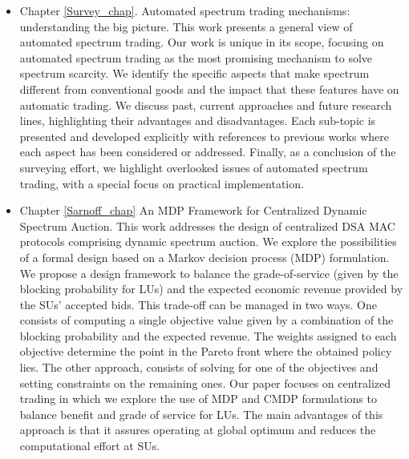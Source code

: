 \begin{itemize}
\item Chapter \ref{Survey_chap}. Automated spectrum trading mechanisms: understanding the big picture.
This work presents a general view of automated spectrum trading.
Our work is unique in its scope, focusing on automated spectrum trading as the most promising mechanism to solve spectrum scarcity.
We identify the specific aspects that make spectrum different from conventional goods and the impact that these features have on automatic trading.
We discuss past, current approaches and future research lines, highlighting their advantages and disadvantages. 
Each sub-topic is presented and developed explicitly with references to previous works where each aspect has been considered or addressed.
Finally, as a conclusion of the surveying effort, we highlight overlooked issues of automated spectrum trading, with a special focus on practical implementation.
\item Chapter \ref{Sarnoff_chap} An MDP Framework for Centralized Dynamic Spectrum Auction.
This work addresses the design of centralized DSA MAC protocols comprising dynamic spectrum auction. We explore the possibilities of a formal design based on a Markov decision process (MDP) formulation. We propose a design framework to balance the grade-of-service (given by the blocking probability for LUs) and the expected economic revenue provided by the SUs' accepted bids. 
This trade-off can be managed in two ways. One consists of computing a single objective value given by a combination of the blocking probability and the expected revenue. 
The weights assigned to each objective determine the point in the Pareto front where the obtained policy lies. The other approach, consists of solving for one of the objectives and setting constraints on the remaining ones.
Our paper focuses on centralized trading in which we explore the use of MDP and CMDP formulations to balance benefit and grade of service for LUs. 
The main advantages of this approach is that it assures operating at global optimum and reduces the computational effort at SUs.

\end{itemize}
